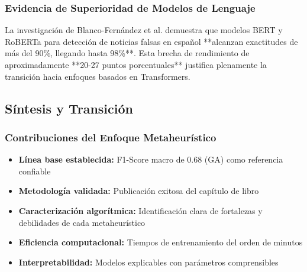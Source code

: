 \subsubsection{Evidencia de Superioridad de Modelos de Lenguaje}

La investigación de Blanco-Fernández et al. \cite{blanco2024enhancing} demuestra que modelos BERT y RoBERTa para detección de noticias falsas en español **alcanzan exactitudes de más del 90\%, llegando hasta 98\%**. Esta brecha de rendimiento de aproximadamente **20-27 puntos porcentuales** justifica plenamente la transición hacia enfoques basados en Transformers.

\begin{table}[htbp]
\centering
{}
\caption{Comparación de rendimiento entre enfoques metaheurísticos y modelos de lenguaje usando métricas macro.}
\label{tab:comparacion_enfoques}
\end{table}

\subsection{Síntesis y Transición}
\label{subsec:sintesis_transicion}

\subsubsection{Contribuciones del Enfoque Metaheurístico}

\begin{itemize}
    \item \textbf{Línea base establecida:} F1-Score macro de 0.68 (GA) como referencia confiable
    \item \textbf{Metodología validada:} Publicación exitosa del capítulo de libro \cite{hurtado2024calibracion}
    \item \textbf{Caracterización algorítmica:} Identificación clara de fortalezas y debilidades de cada metaheurístico
    \item \textbf{Eficiencia computacional:} Tiempos de entrenamiento del orden de minutos
    \item \textbf{Interpretabilidad:} Modelos explicables con parámetros comprensibles
\end{itemize}

